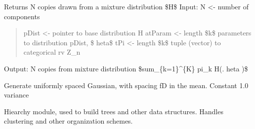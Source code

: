\documentclass[letterpaper,10pt,english]{sphinxmanual}
\begin{document}
\begin{fulllineitems}
\label{index:halla.test.randmix}
Returns N copies drawn from a mixture distribution \$H\$ 
Input: N \textless{}- number of components
\begin{quote}

pDist \textless{}- pointer to base distribution H 
atParam \textless{}- length \$k\$ parameters to distribution pDist, \$       heta\$  
tPi \textless{}- length \$k\$ tuple (vector) to categorical rv Z\_n
\end{quote}

Output: N copies from mixture distribution \$sum\_\{k=1\}\textasciicircum{}\{K\} pi\_k H(.\textbar{}   heta )\$

\end{fulllineitems}


\begin{fulllineitems}
\label{index:halla.test.uniformly_spaced_gaussian}
Generate uniformly spaced Gaussian, with spacing fD in the mean.
Constant 1.0 variance

\end{fulllineitems}

\label{index:module-halla.hierarchy}
Hiearchy module, used to build trees and other data structures.
Handles clustering and other organization schemes.
\end{document}
